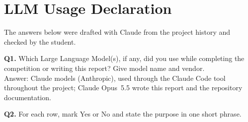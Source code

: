 \documentclass[11pt, oneside]{article}
\begin{document}
\section*{LLM Usage Declaration}
The answers below were drafted with Claude from the project history and checked by the student.
\par\medskip
\noindent
\textbf{Q1.} Which Large Language Model(s), if any, did you use while completing the competition or writing this report? Give model name and vendor. \\[0.6em]
Answer: Claude models (Anthropic), used through the Claude Code tool throughout the project; Claude Opus~5.5 wrote this report and the repository documentation.
\par\medskip
\noindent
\textbf{Q2.} For each row, mark Yes or No and state the purpose in one short phrase.
\end{document}
